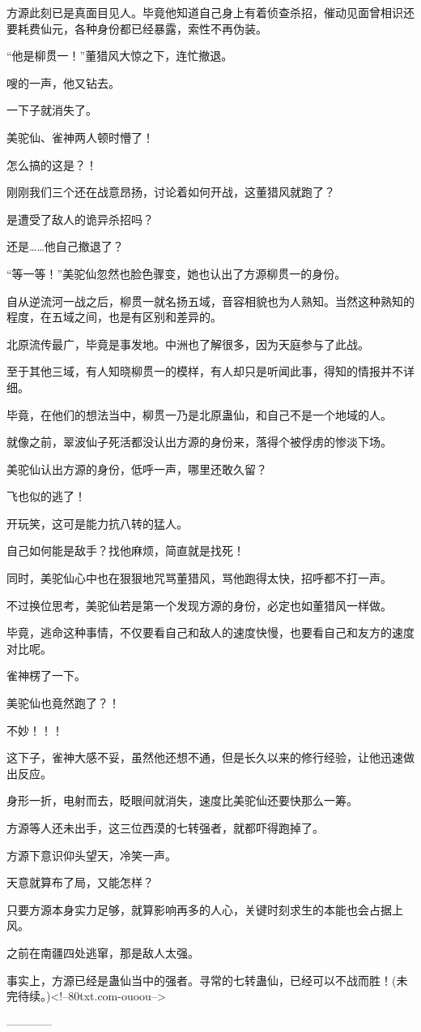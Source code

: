 \begin{this_body}
方源此刻已是真面目见人。毕竟他知道自己身上有着侦查杀招，催动见面曾相识还要耗费仙元，各种身份都已经暴露，索性不再伪装。

“他是柳贯一！”董猎风大惊之下，连忙撤退。

嗖的一声，他又钻去。

一下子就消失了。

美驼仙、雀神两人顿时懵了！

怎么搞的这是？！

刚刚我们三个还在战意昂扬，讨论着如何开战，这董猎风就跑了？

是遭受了敌人的诡异杀招吗？

还是……他自己撤退了？

“等一等！”美驼仙忽然也脸色骤变，她也认出了方源柳贯一的身份。

自从逆流河一战之后，柳贯一就名扬五域，音容相貌也为人熟知。当然这种熟知的程度，在五域之间，也是有区别和差异的。

北原流传最广，毕竟是事发地。中洲也了解很多，因为天庭参与了此战。

至于其他三域，有人知晓柳贯一的模样，有人却只是听闻此事，得知的情报并不详细。

毕竟，在他们的想法当中，柳贯一乃是北原蛊仙，和自己不是一个地域的人。

就像之前，翠波仙子死活都没认出方源的身份来，落得个被俘虏的惨淡下场。

美驼仙认出方源的身份，低呼一声，哪里还敢久留？

飞也似的逃了！

开玩笑，这可是能力抗八转的猛人。

自己如何能是敌手？找他麻烦，简直就是找死！

同时，美驼仙心中也在狠狠地咒骂董猎风，骂他跑得太快，招呼都不打一声。

不过换位思考，美驼仙若是第一个发现方源的身份，必定也如董猎风一样做。

毕竟，逃命这种事情，不仅要看自己和敌人的速度快慢，也要看自己和友方的速度对比呢。

雀神楞了一下。

美驼仙也竟然跑了？！

不妙！！！

这下子，雀神大感不妥，虽然他还想不通，但是长久以来的修行经验，让他迅速做出反应。

身形一折，电射而去，眨眼间就消失，速度比美驼仙还要快那么一筹。

方源等人还未出手，这三位西漠的七转强者，就都吓得跑掉了。

方源下意识仰头望天，冷笑一声。

天意就算布了局，又能怎样？

只要方源本身实力足够，就算影响再多的人心，关键时刻求生的本能也会占据上风。

之前在南疆四处逃窜，那是敌人太强。

事实上，方源已经是蛊仙当中的强者。寻常的七转蛊仙，已经可以不战而胜！(未完待续。)<!--80txt.com-ouoou-->

------------

\end{this_body}

